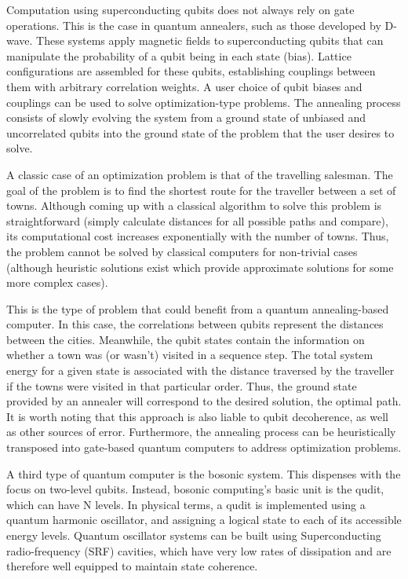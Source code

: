 Computation using superconducting qubits does not always rely on gate operations. This is the case in quantum annealers, such as those developed by D-wave. These systems apply magnetic fields to superconducting qubits that can manipulate the probability of a qubit being in each state (bias). Lattice configurations are assembled for these qubits, establishing couplings between them with arbitrary correlation weights. A user choice of qubit biases and couplings can be used to solve optimization-type problems. The annealing process consists of slowly evolving the system from a ground state of unbiased and uncorrelated qubits into the ground state of the problem that the user desires to solve.

A classic case of an optimization problem is that of the travelling salesman. The goal of the problem is to find the shortest route for the traveller between a set of towns. Although coming up with a classical algorithm to solve this problem is straightforward (simply calculate distances for all possible paths and compare), its computational cost increases exponentially with the number of towns. Thus, the problem cannot be solved by classical computers for non-trivial cases (although heuristic solutions exist which provide approximate solutions for some more complex cases).

This is the type of problem that could benefit from a quantum annealing-based computer. In this case, the correlations between qubits represent the distances between the cities. Meanwhile, the qubit states contain the information on whether a town was (or wasn't) visited in a sequence step. The total system energy for a given state is associated with the distance traversed by the traveller if the towns were visited in that particular order. Thus, the ground state provided by an annealer will correspond to the desired solution, the optimal path. It is worth noting that this approach is also liable to qubit decoherence, as well as other sources of error. Furthermore, the annealing process can be heuristically transposed into gate-based quantum computers to address optimization problems.

A third type of quantum computer is the bosonic system. This dispenses with the focus on two-level qubits. Instead, bosonic computing's basic unit is the qudit, which can have N levels. In physical terms, a qudit is implemented using a quantum harmonic oscillator, and assigning a logical state to each of its accessible energy levels. Quantum oscillator systems can be built using Superconducting radio-frequency (SRF) cavities, which have very low rates of dissipation and are therefore well equipped to maintain state coherence. 


